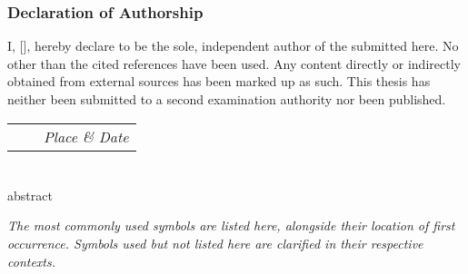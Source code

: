 \subsection*{Declaration of Authorship}
{%
\makeatletter
I, \@author{} [\@immnumber], hereby declare to be the sole, independent author of the \@thesis{} submitted here.
No other than the cited references have been used.
Any content directly or indirectly obtained from external sources has been marked up as such.
This thesis has neither been submitted to a second examination authority nor been published.\\[\baselineskip]

\begin{center}
	\begin{tabular}{M{12em}M{4em}M{12em}}
		{\itshape\@author} & & \textit{Place \& Date}\\
	\end{tabular}
\end{center}
\makeatother%
}%
\cleardoublepage
\chapter*{\abstractname}%
{abstract}%
\tableofcontents%
\addchap{\glossaryname}%

\textit{The most commonly used symbols are listed here, alongside their location of first occurrence. Symbols used but not listed here are clarified in their respective contexts.}

